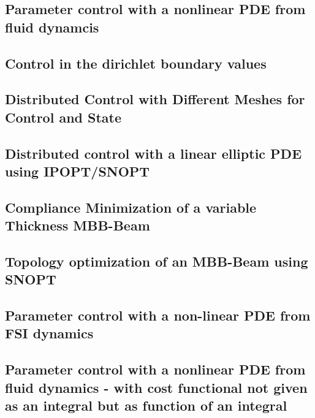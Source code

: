 \documentclass[a4paper,cleardoubleempty]{scrreprt}
\theoremstyle{plain}
\theoremstyle{remark}
\begin{document}
\subsection{Parameter control with a nonlinear PDE from fluid dynamcis}
\label{OPT_Stat_Param_Nonlin_Fluid}

\clearpage
\subsection{Control in the dirichlet boundary values}
\label{OPT_Stat_Dirichlet_Boundary}

\clearpage
\subsection{Distributed Control with Different Meshes for Control and State}
\label{OPT_Stat_Distributed_MultiMesh}

\clearpage
\subsection{Distributed control with a linear elliptic PDE using IPOPT/SNOPT}
\label{OPT_Stat_Box_controlconstraints_SNOPT}

\clearpage
\subsection{Compliance Minimization of a variable Thickness MBB-Beam}
\label{OPT_Stat_MBB-Beam}

\clearpage
\subsection{Topology optimization of an MBB-Beam using SNOPT}
\label{OPT_Stat_TopOpt_MBB_SNOPT}

\clearpage
\subsection{Parameter control with a non-linear PDE from FSI dynamics}
\label{OPT_Stat_Param_Nonlin_FSI}

\clearpage
\subsection{Parameter control with a nonlinear PDE from fluid dynamics - with cost functional
not given as an integral but as function of an integral}
\label{OPT_Stat_Param_Nonlin_Fluid_extension}

\clearpage
\end{document}
